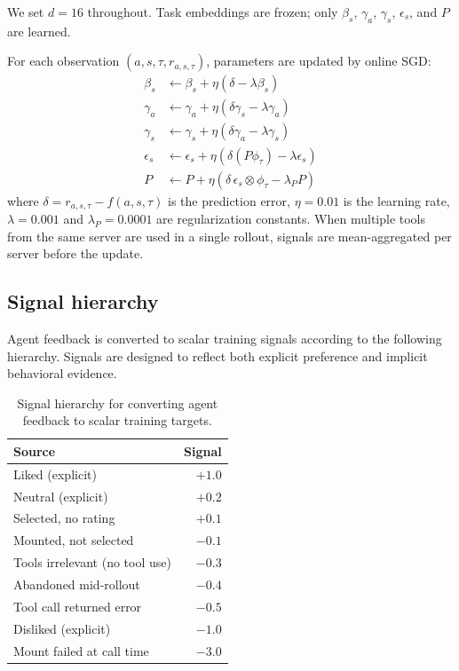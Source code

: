 \documentclass{article} %
\begin{document}
We set $d = 16$ throughout. Task embeddings are frozen; only $\beta_s$, $\gamma_a$, $\gamma_s$, $\epsilon_s$, and $P$ are learned.

For each observation $(a, s, \tau, r_{a,s,\tau})$, parameters are updated by online SGD:
\begin{align}
\beta_s &\leftarrow \beta_s + \eta(\delta - \lambda\beta_s) \\
\gamma_a &\leftarrow \gamma_a + \eta(\delta\gamma_s - \lambda\gamma_a) \\
\gamma_s &\leftarrow \gamma_s + \eta(\delta\gamma_a - \lambda\gamma_s) \\
\epsilon_s &\leftarrow \epsilon_s + \eta(\delta(P\phi_\tau) - \lambda\epsilon_s) \\
P &\leftarrow P + \eta(\delta\,\epsilon_s \otimes \phi_\tau - \lambda_P P)
\end{align}
where $\delta = r_{a,s,\tau} - f(a, s, \tau)$ is the prediction error, $\eta = 0.01$ is the learning rate, $\lambda = 0.001$ and $\lambda_P = 0.0001$ are regularization constants. When multiple tools from the same server are used in a single rollout, signals are mean-aggregated per server before the update.

\subsection{Signal hierarchy}
\label{sec:signals}

Agent feedback is converted to scalar training signals according to the following hierarchy. Signals are designed to reflect both explicit preference and implicit behavioral evidence.

\begin{table}[t]
\begin{center}
\begin{tabular}{lr}
\toprule
\textbf{Source} & \textbf{Signal} \\
\midrule
Liked (explicit) & $+1.0$ \\
Neutral (explicit) & $+0.2$ \\
Selected, no rating & $+0.1$ \\
Mounted, not selected & $-0.1$ \\
Tools irrelevant (no tool use) & $-0.3$ \\
Abandoned mid-rollout & $-0.4$ \\
Tool call returned error & $-0.5$ \\
Disliked (explicit) & $-1.0$ \\
Mount failed at call time & $-3.0$ \\
\bottomrule
\end{tabular}
\end{center}
\caption{Signal hierarchy for converting agent feedback to scalar training targets.}
\label{tab:signals}
\end{table}
\end{document}
